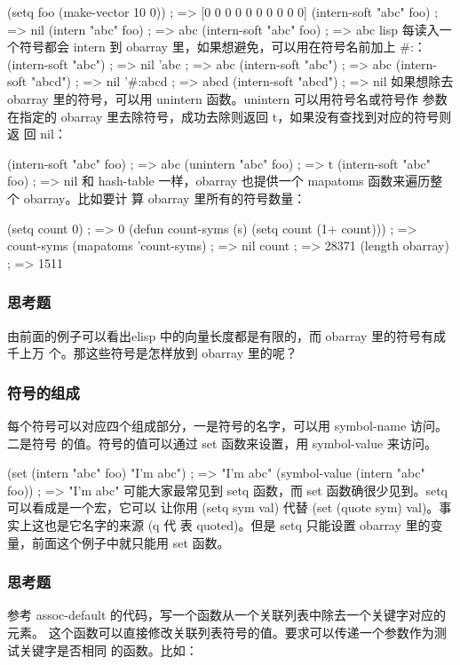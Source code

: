 \documentclass[11pt]{ctexart}
\begin{document}
(setq foo (make-vector 10 0))           ; => [0 0 0 0 0 0 0 0 0 0]
(intern-soft "abc" foo)                 ; => nil
(intern "abc" foo)                      ; => abc
(intern-soft "abc" foo)                 ; => abc
lisp 每读入一个符号都会 intern 到 obarray 里，如果想避免，可以用在符号名前加上 \#:：
(intern-soft "abc")                     ; => nil
'abc                                    ; => abc
(intern-soft "abc")                     ; => abc
(intern-soft "abcd")                    ; => nil
'\#:abcd                                 ; => abcd
(intern-soft "abcd")                    ; => nil
如果想除去 obarray 里的符号，可以用 unintern 函数。unintern 可以用符号名或符号作
参数在指定的 obarray 里去除符号，成功去除则返回 t，如果没有查找到对应的符号则返
回 nil：

(intern-soft "abc" foo)                 ; => abc
(unintern "abc" foo)                    ; => t
(intern-soft "abc" foo)                 ; => nil
和 hash-table 一样，obarray 也提供一个 mapatoms 函数来遍历整个 obarray。比如要计
算 obarray 里所有的符号数量：

(setq count 0)                          ; => 0
(defun count-syms (s)
(setq count (1+ count)))              ; => count-syms
(mapatoms 'count-syms)                  ; => nil
count                                   ; => 28371
(length obarray)                        ; => 1511
\subsubsection{思考题}
\label{sec:org6954b94}
由前面的例子可以看出elisp 中的向量长度都是有限的，而 obarray 里的符号有成千上万
个。那这些符号是怎样放到 obarray 里的呢？

\subsubsection{符号的组成}
\label{sec:org126a957}
每个符号可以对应四个组成部分，一是符号的名字，可以用 symbol-name 访问。二是符号
的值。符号的值可以通过 set 函数来设置，用 symbol-value 来访问。

(set (intern "abc" foo) "I'm abc")      ; => "I'm abc"
(symbol-value (intern "abc" foo))       ; => "I'm abc"
可能大家最常见到 setq 函数，而 set 函数确很少见到。setq 可以看成是一个宏，它可以
让你用 (setq sym val) 代替 (set (quote sym) val)。事实上这也是它名字的来源 (q 代
表 quoted)。但是 setq 只能设置 obarray 里的变量，前面这个例子中就只能用 set 函数。

\subsubsection{思考题}
\label{sec:org93b918c}
参考 assoc-default 的代码，写一个函数从一个关联列表中除去一个关键字对应的元素。
这个函数可以直接修改关联列表符号的值。要求可以传递一个参数作为测试关键字是否相同
的函数。比如：
\end{document}
